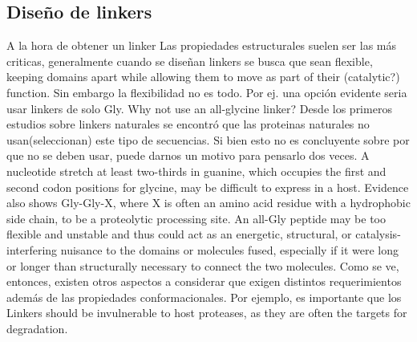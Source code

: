 % 
% 
% 
% 









































  
  
  
  
  
  
  
  
  
  
  
\subsection{Diseño de linkers}

A la hora de obtener un linker 
Las propiedades estructurales suelen ser las más criticas, generalmente cuando se diseñan linkers se busca que sean flexible, keeping domains apart while allowing them to move as part of their (catalytic?) function. 
Sin embargo la flexibilidad no es todo. 
Por ej. una opción evidente seria usar linkers de solo Gly.
Why not use an all-glycine linker? 
Desde los primeros estudios sobre linkers naturales \cite{argos1990investigation} se encontró que las proteinas naturales no usan(seleccionan) este tipo de secuencias.
Si bien esto no es concluyente sobre por que no se deben usar, puede darnos un motivo para pensarlo dos veces.
A nucleotide stretch at least two-thirds in guanine, which occupies the first and second codon positions for glycine, may be difficult to express in a host.
Evidence also shows Gly-Gly-X, where X is often an amino acid residue with a hydrophobic side chain, to be a proteolytic processing site.
An all-Gly peptide may be too flexible and unstable and thus could act as an energetic, structural, or catalysis-interfering nuisance to the
domains or molecules fused, especially if it were long or longer than structurally necessary to connect the two molecules.
Como se ve, entonces, existen otros aspectos a considerar que exigen distintos requerimientos además de las propiedades conformacionales.
Por ejemplo, es importante que los Linkers should be invulnerable to host proteases, as they are often the targets for degradation. 


